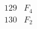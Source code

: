 \documentclass{article}
\begin{document}
{$$\begin{array}{|r|*{7}{r|}}
 & 
 & 
 & 
 & 
\\
\hline
129 
 & F_{4} &
 & 
 & 
 & 
 & 
 & 
\\
\hline
130 
 & F_{2} &
 & 
 & 
 & 
 & 
 & 

\end{array}$$}
\end{document}
